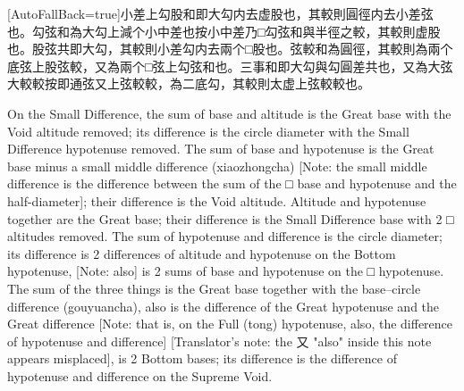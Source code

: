 \documentclass[11pt]{article}
\newcommand{\zhsmall}{\footnotesize\color{black!70}}
\newcommand{\unitlabel}[1]{\marginpar{\raggedleft\tiny\color{gray}#1}}
\newenvironment{unitzh}{\par\CJKfontspec{Noto Serif CJK SC}[AutoFallBack=true]\large\linespread{1.25}\selectfont}{\par}
\newenvironment{uniten}{\par\small\color{black!85}}{\par\medskip}
\begin{document}
\begin{unitzh}\unitlabel{ceyuan-003.3}小差上勾股和即大勾内去虚股也，其較則圓徑内去小差弦也。勾弦和為大勾上減个小中差也{\zhsmall 按小中差乃□勾弦和與半徑之較}，其較則虚股也。股弦共即大勾，其較則小差勾内去兩个□股也。弦較和為圓徑，其較則為兩个底弦上股弦較，{\zhsmall 又}為兩个□弦上勾弦和也。三事和即大勾與勾圓差共也，又為大弦大較較{\zhsmall 按即通弦又上弦較較}，為二底勾，其較則太虚上弦較較也。\end{unitzh}
\begin{uniten}On the Small Difference, the sum of base and altitude is the Great base with the Void altitude removed; its difference is the circle diameter with the Small Difference hypotenuse removed. The sum of base and hypotenuse is the Great base minus a small middle difference (xiaozhongcha) [Note: the small middle difference is the difference between the sum of the □ base and hypotenuse and the half-diameter]; their difference is the Void altitude. Altitude and hypotenuse together are the Great base; their difference is the Small Difference base with 2 □ altitudes removed. The sum of hypotenuse and difference is the circle diameter; its difference is 2 differences of altitude and hypotenuse on the Bottom hypotenuse, [Note: also] is 2 sums of base and hypotenuse on the □ hypotenuse. The sum of the three things is the Great base together with the base–circle difference (gouyuancha), also is the difference of the Great hypotenuse and the Great difference [Note: that is, on the Full (tong) hypotenuse, also, the difference of hypotenuse and difference] [Translator's note: the 又 "also" inside this note appears misplaced], is 2 Bottom bases; its difference is the difference of hypotenuse and difference on the Supreme Void.\end{uniten}
\end{document}
